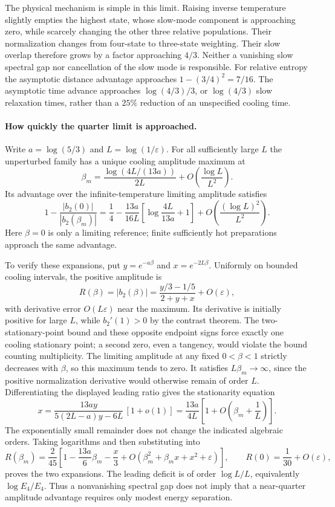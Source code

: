 \documentclass[11pt]{article}
\begin{document}
The physical mechanism is simple in this limit. Raising inverse temperature
slightly empties the highest state, whose slow-mode component is approaching
zero, while scarcely changing the other three relative populations. Their
normalization changes from four-state to three-state weighting. Their slow
overlap therefore grows by a factor approaching $4/3$. Neither a vanishing
slow spectral gap nor cancellation of the slow mode is responsible. For
relative entropy the asymptotic distance advantage approaches
$1-(3/4)^2=7/16$. The asymptotic time advance approaches
$\log(4/3)/3$, or $\log(4/3)$ slow relaxation times, rather than a $25\%$
reduction of an unspecified cooling time.

\paragraph{How quickly the quarter limit is approached.}
Write $a=\log(5/3)$ and $L=\log(1/\varepsilon)$. For all sufficiently large
$L$ the unperturbed family has a unique cooling amplitude maximum at
\[
\beta_m=\frac{\log(4L/(13a))}{2L}
+O\!\left(\frac{\log L}{L^2}\right).
\]
Its advantage over the infinite-temperature limiting amplitude satisfies
\begin{equation}\label{eq:quarterapproach}
1-\frac{|b_2(0)|}{|b_2(\beta_m)|}
=\frac14-\frac{13a}{16L}
 \left[\log\frac{4L}{13a}+1\right]
+O\!\left(\frac{(\log L)^2}{L^2}\right).
\end{equation}
Here $\beta=0$ is only a limiting reference; finite sufficiently hot
preparations approach the same advantage.

To verify these expansions, put $y=e^{-a\beta}$ and $x=e^{-2L\beta}$.
Uniformly on bounded cooling intervals, the positive amplitude is
\[
R(\beta)=|b_2(\beta)|
=\frac{y/3-1/5}{2+y+x}+O(\varepsilon),
\]
with derivative error $O(L\varepsilon)$ near the maximum. Its derivative is
initially positive for large $L$, while $b_2'(1)>0$ by the contrast theorem.
The two-stationary-point bound and these opposite endpoint signs force exactly
one cooling stationary point; a second zero, even a tangency, would violate
the bound counting multiplicity. The limiting amplitude at any fixed
$0<\beta<1$ strictly decreases with $\beta$, so this maximum tends to zero.
It satisfies $L\beta_m\to\infty$, since the positive normalization derivative
would otherwise remain of order $L$. Differentiating the displayed leading
ratio gives the stationarity equation
\[
x=\frac{13ay}{5(2L-a)y-6L}\,[1+o(1)]
=\frac{13a}{4L}\left[1+O\!\left(\beta_m+\frac1L\right)\right].
\]
The exponentially small remainder does not change the indicated algebraic
orders. Taking logarithms and then substituting into
\[
R(\beta_m)=\frac2{45}
\left[1-\frac{13a}{6}\beta_m-\frac{x}{3}
+O(\beta_m^2+\beta_m x+x^2+\varepsilon)\right],
\qquad R(0)=\frac1{30}+O(\varepsilon),
\]
proves the two expansions. The leading deficit is of order
$\log L/L$, equivalently $\log E_4/E_4$. Thus a nonvanishing spectral gap
does not imply that a near-quarter amplitude advantage requires only modest
energy separation.
\end{document}
